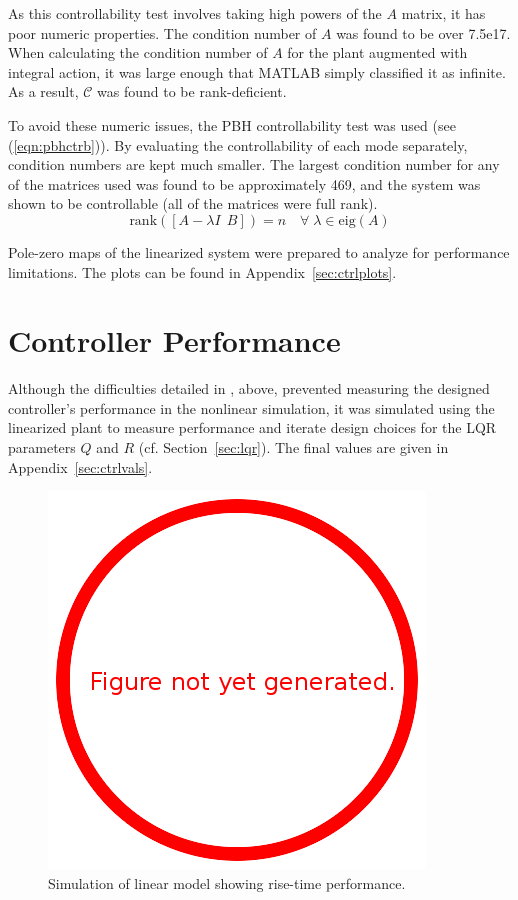 \documentclass{sydeStyle}
\begin{document}
As this controllability test involves taking high powers of the $A$ matrix, it
has poor numeric properties.  The condition number of $A$ was found to be over
7.5e17.  When calculating the condition number of $A$ for the plant augmented
with integral action, it was large enough that MATLAB simply classified it as
infinite.  As a result, $\mathcal{C}$ was found to be rank-deficient.

To avoid these numeric issues, the PBH controllability test was used (see
(\ref{eqn:pbhctrb})).  By evaluating the controllability of each mode separately,
condition numbers are kept much smaller.  The largest condition number for any
of the matrices used was found to be approximately 469, and the system was shown
to be controllable (all of the matrices were full rank).
\begin{equation}
    \textrm{rank}([A - \lambda I \;\, B]) = n \quad \forall \; \lambda \in
    \textrm{eig}(A)
    \label{eqn:pbhctrb}
\end{equation}

Pole-zero maps of the linearized system were prepared to analyze for performance
limitations.  The plots can be found in Appendix~\ref{sec:ctrlplots}.

\section{Controller Performance}
Although the difficulties detailed in , above, prevented
measuring the designed controller's performance in the nonlinear simulation, it
was simulated using the linearized plant to measure performance and iterate
design choices for the LQR parameters $Q$ and $R$ (cf.  Section~\ref{sec:lqr}).
The final values are given in Appendix~\ref{sec:ctrlvals}.

\begin{figure}[b]
    \begin{center}
        \includegraphics{figs/todo}
    \end{center}
    \caption{Simulation of linear model showing rise-time performance.}
    \label{fig:linrisetime}
\end{figure}
\end{document}
